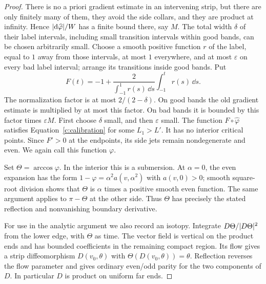 \begin{proof}
There is no a priori gradient estimate in an intervening strip, but
there are only finitely many of them, they avoid the side collars, and
they are product at infinity.  Hence
$\lvert\mathrm d\widehat\varphi\rvert/W$ has a finite bound there, say $M$.
The total width $\delta$ of their label intervals, including small
transition intervals within good bands, can be chosen arbitrarily
small.  Choose a smooth positive function $r$ of the label, equal to
$1$ away from those intervals, at most $1$ everywhere, and at most
$\varepsilon$ on every bad label interval; arrange its transitions
inside good bands.  Put
\[
 F(t)=-1+\frac{2}{\int_{-1}^1r(s)\,\dd s}
                    \int_{-1}^t r(s)\,\dd s.
\]
The normalization factor is at most $2/(2-\delta)$.
On good bands the old gradient estimate is multiplied by at most this
factor.  On bad bands it is bounded by this factor times $\varepsilon M$.
First choose $\delta$ small, and then $\varepsilon$ small.  The function
$F\circ\widehat\varphi$ satisfies Equation~\eqref{c:calibration} for some
$L_1>L'$.  It has no interior critical points.  Since $F'>0$ at the
endpoints, its side jets remain nondegenerate and even.  We again call
this function $\varphi$.

Set $\Theta=\arccos\varphi$.  In the interior this is a submersion.
At $\alpha=0$, the even expansion has the form
$1-\varphi=\alpha^2 a(v,\alpha^2)$ with $a(v,0)>0$; smooth square-root
division shows that $\Theta$ is $\alpha$ times a positive smooth even
function.  The same argument applies to $\pi-\Theta$ at the other side.
Thus $\Theta$ has precisely the stated reflection and nonvanishing
boundary derivative.

For use in the analytic argument we also record an isotopy.  Integrate
$D\Theta/\lvert D\Theta\rvert^2$ from the lower edge, with $\Theta$ as time.
The vector field is vertical on the product ends and has bounded
coefficients in the remaining compact region.  Its flow gives a strip
diffeomorphism $D(v_0,\theta)$ with $\Theta(D(v_0,\theta))=\theta$.
Reflection reverses the flow parameter and gives ordinary even/odd
parity for the two components of $D$.  In particular $D$ is product on
uniform far ends.


\end{proof}
